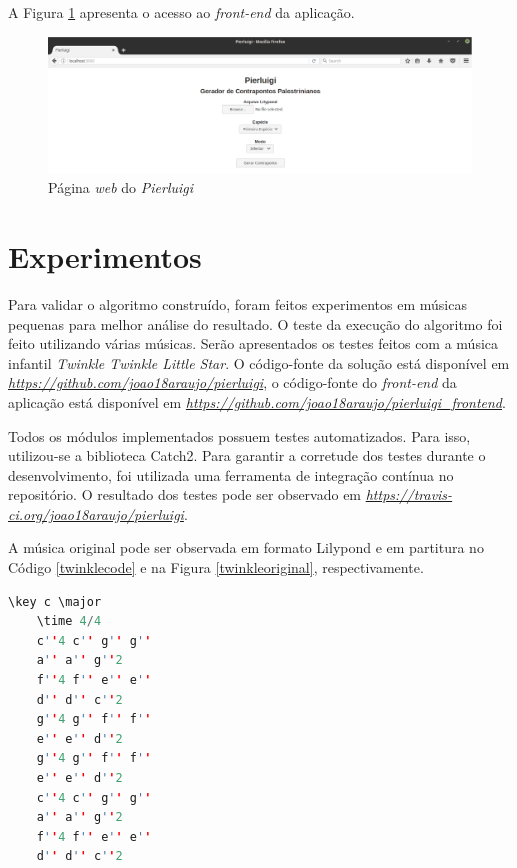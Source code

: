             A Figura \ref{counterpointgenerator} apresenta o acesso ao \textit{front-end} da aplicação.

            \begin{figure}[htb]
              \centering
              \includegraphics[scale=0.45]{figuras/counterpointgenerator.eps}
              \caption{Página \textit{web} do \textit{Pierluigi}}
              \label{counterpointgenerator}
            \end{figure}

  \section[Experimentos]{Experimentos}

    Para validar o algoritmo construído, foram feitos experimentos em músicas pequenas para melhor análise do resultado. O teste da execução do algoritmo foi feito utilizando várias músicas. Serão apresentados os testes feitos com a música infantil \textit{Twinkle Twinkle Little Star}. O código-fonte da solução está disponível em \textit{\url{https://github.com/joao18araujo/pierluigi}}, o código-fonte do \textit{front-end} da aplicação está disponível em \textit{\url{https://github.com/joao18araujo/pierluigi_frontend}}.

    Todos os módulos implementados possuem testes automatizados. Para isso, utilizou-se a biblioteca Catch2. Para garantir a corretude dos testes durante o desenvolvimento, foi utilizada uma ferramenta de integração contínua no repositório. O resultado dos testes pode ser observado em \textit{\url{https://travis-ci.org/joao18araujo/pierluigi}}.

    A música original pode ser observada em formato Lilypond e em partitura no Código \ref{twinklecode} e na Figura \ref{twinkleoriginal}, respectivamente.

    \begin{lstlisting}[language={C++}, caption={\textit{Twinkle Twinkle Little Star}}, label={twinklecode}]
    \key c \major
    \time 4/4
    c''4 c'' g'' g''
    a'' a'' g''2
    f''4 f'' e'' e''
    d'' d'' c''2
    g''4 g'' f'' f''
    e'' e'' d''2
    g''4 g'' f'' f''
    e'' e'' d''2
    c''4 c'' g'' g''
    a'' a'' g''2
    f''4 f'' e'' e''
    d'' d'' c''2
    \end{lstlisting}


